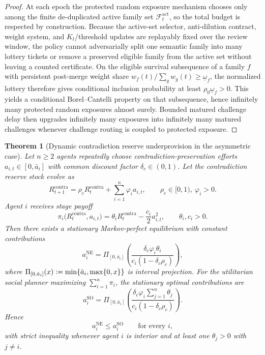 \documentclass[11pt]{article}
\newtheorem{theorem}{Theorem}[section]
\theoremstyle{definition}
\newcommand{\1}{\mathbf{1}}
\newcommand{\Defeq}{\vcentcolon=}
\begin{document}
\begin{proof}
At each epoch the protected random exposure mechanism chooses only among the finite de-duplicated active family set $\mathcal F_t^{\mathrm{act}}$, so the total budget is respected by construction. Because the active-set selector, anti-dilution contract, weight system, and $K_t$/threshold updates are replayably fixed over the review window, the policy cannot adversarially split one semantic family into many lottery tickets or remove a preserved eligible family from the active set without leaving a counted certificate. On the eligible survival subsequence of a family $f$ with persistent post-merge weight share $w_f(t)/\sum_g w_g(t)\ge \underline\omega_f$, the normalized lottery therefore gives conditional inclusion probability at least $\rho_0\underline\omega_f>0$. This yields a conditional Borel--Cantelli property on that subsequence, hence infinitely many protected random exposures almost surely. Bounded matured challenge delay then upgrades infinitely many exposures into infinitely many matured challenges whenever challenge routing is coupled to protected exposure.
\end{proof}

\begin{theorem}[Dynamic contradiction reserve underprovision in the asymmetric case]\label{thm:contradiction_dynamic}
Let $n\ge 2$ agents repeatedly choose contradiction-preservation efforts $a_{i,t}\in[0,\bar a_i]$ with common discount factor $\delta_c\in(0,1)$. Let the contradiction reserve stock evolve as
\[
R_{t+1}^{\mathrm{contra}} = \rho_c R_t^{\mathrm{contra}} + \sum_{i=1}^n \varphi_i a_{i,t},
\qquad
\rho_c\in[0,1),\ \varphi_i>0.
\]
Agent $i$ receives stage payoff
\[
\pi_i\bigl(R_t^{\mathrm{contra}},a_{i,t}\bigr)=\theta_i R_t^{\mathrm{contra}} - \frac{c_i}{2}a_{i,t}^2,
\qquad \theta_i,c_i>0.
\]
Then there exists a stationary Markov-perfect equilibrium with constant contributions
\[
a_i^{\mathrm{NE}}=\Pi_{[0,\bar a_i]}\!\left(\frac{\delta_c\varphi_i\theta_i}{c_i(1-\delta_c \rho_c)}\right),
\]
where $\Pi_{[0,\bar a_i]}(x)\Defeq \min\{\bar a_i,\max\{0,x\}\}$ is interval projection. For the utilitarian social planner maximizing $\sum_{i=1}^n \pi_i$, the stationary optimal contributions are
\[
a_i^{\mathrm{SO}}=\Pi_{[0,\bar a_i]}\!\left(\frac{\delta_c\varphi_i\sum_{j=1}^n\theta_j}{c_i(1-\delta_c \rho_c)}\right).
\]
Hence
\[
a_i^{\mathrm{NE}}\le a_i^{\mathrm{SO}}\qquad\text{for every }i,
\]
with strict inequality whenever agent $i$ is interior and at least one $\theta_j>0$ with $j\neq i$.
\end{theorem}
\end{document}

